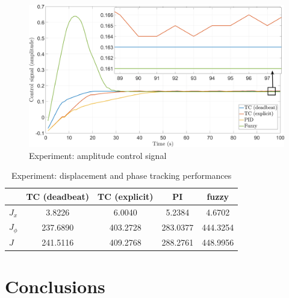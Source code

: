 \documentclass[lettersize,journal]{IEEEtran}
\begin{document}
\begin{figure}
    \centering    \includegraphics[width=\linewidth]{F_control_amplitude.png}
    \caption{Experiment: amplitude control signal}
    \label{F_amplitude_control_signal}
\end{figure}



\begin{table}
    \centering
    \begin{tabular}{|l|c|c|c|c|} \hline
       \cellcolor{gray}  &  TC (deadbeat) &  TC (explicit)   & PI & fuzzy   \\  \hline 
      $J_x$     & 3.8226    & 6.0040    &  5.2384   & 4.6702  \\  \hline 
      $J_\phi$  & 237.6890  & 403.2728  & 283.0377  & 444.3254  \\ \hline 
       $J$ &  241.5116      & 409.2768  &   288.2761 & 448.9956 \\ \hline 
    \end{tabular}
    \vspace{0.1cm}
    \caption{Experiment: displacement and phase tracking performances}
    \label{T_J_experiment}
\end{table}



\section{Conclusions} \label{S_conclusions}
\end{document}
